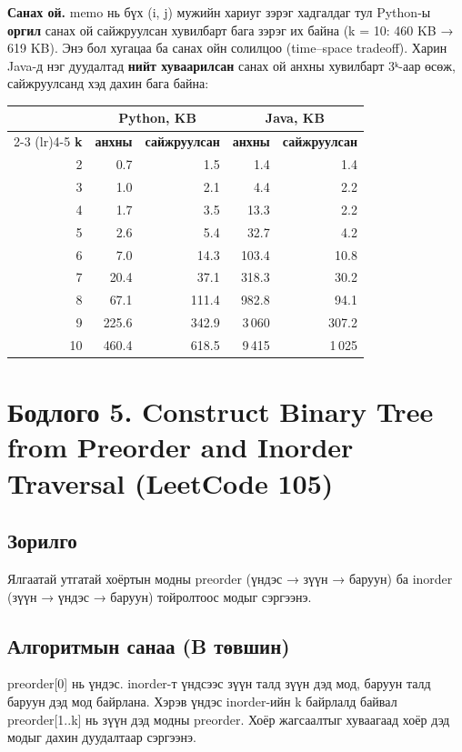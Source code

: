 \documentclass[11pt,a4paper]{article}
\begin{document}
\textbf{Санах ой.} memo нь бүх (i, j) мужийн хариуг зэрэг хадгалдаг тул Python-ы \textbf{оргил} санах ой сайжруулсан хувилбарт бага зэрэг их байна (k = 10: 460 KB → 619 KB). Энэ бол хугацаа ба санах ойн солилцоо (time–space tradeoff). Харин Java-д нэг дуудалтад \textbf{нийт хуваарилсан} санах ой анхны хувилбарт 3ᵏ-аар өсөж, сайжруулсанд хэд дахин бага байна:

\begin{center}
\footnotesize
\begin{tabular}{rrrrr}
\toprule
\multicolumn{1}{c}{} & \multicolumn{2}{c}{\textbf{Python, KB}} & \multicolumn{2}{c}{\textbf{Java, KB}} \\
\cmidrule(lr){2-3} \cmidrule(lr){4-5}
\textbf{k} & \textbf{анхны} & \textbf{сайжруулсан} & \textbf{анхны} & \textbf{сайжруулсан} \\
\midrule
2 & 0.7 & 1.5 & 1.4 & 1.4 \\
3 & 1.0 & 2.1 & 4.4 & 2.2 \\
4 & 1.7 & 3.5 & 13.3 & 2.2 \\
5 & 2.6 & 5.4 & 32.7 & 4.2 \\
6 & 7.0 & 14.3 & 103.4 & 10.8 \\
7 & 20.4 & 37.1 & 318.3 & 30.2 \\
8 & 67.1 & 111.4 & 982.8 & 94.1 \\
9 & 225.6 & 342.9 & 3\,060 & 307.2 \\
10 & 460.4 & 618.5 & 9\,415 & 1\,025 \\
\bottomrule
\end{tabular}
\end{center}

\section{Бодлого 5. Construct Binary Tree from Preorder and Inorder Traversal (LeetCode 105)}

\subsection{Зорилго}
Ялгаатай утгатай хоёртын модны preorder (үндэс → зүүн → баруун) ба inorder (зүүн → үндэс → баруун) тойролтоос модыг сэргээнэ.

\subsection{Алгоритмын санаа (B төвшин)}
preorder[0] нь үндэс. inorder-т үндсээс зүүн талд зүүн дэд мод, баруун талд баруун дэд мод байрлана. Хэрэв үндэс inorder-ийн k байрлалд байвал preorder[1..k] нь зүүн дэд модны preorder. Хоёр жагсаалтыг хуваагаад хоёр дэд модыг дахин дуудалтаар сэргээнэ.
\end{document}

